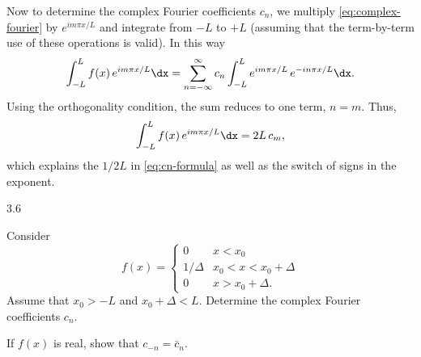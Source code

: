 Now to determine the complex Fourier coefficients $c_n$, we multiply \eqref{eq:complex-fourier} by $e^{im\pi x/L}$ and integrate from $-L$ to $+L$ (assuming that the term-by-term use of these operations is valid).  In this way
\[
\int_{-L}^{L} f(x)\,e^{im\pi x/L}\dx = \sum_{n=-\infty}^{\infty} c_n \int_{-L}^{L} e^{im\pi x/L}\,e^{-in\pi x/L}\dx.
\]
Using the orthogonality condition, the sum reduces to one term, $n = m$.  Thus,
\[
\int_{-L}^{L} f(x)\,e^{im\pi x/L}\dx = 2L\,c_m,
\]
which explains the $1/2L$ in \eqref{eq:cn-formula} as well as the switch of signs in the exponent.

\begin{exercises}{3.6}
\item[\starred 3.6.1.] Consider
\[
f(x) = \begin{cases} 0 & x < x_0 \\ 1/\Delta & x_0 < x < x_0 + \Delta \\ 0 & x > x_0 + \Delta. \end{cases}
\]
Assume that $x_0 > -L$ and $x_0 + \Delta < L$.  Determine the complex Fourier coefficients $c_n$.

\item If $f(x)$ is real, show that $c_{-n} = \bar{c}_n$.
\end{exercises}
